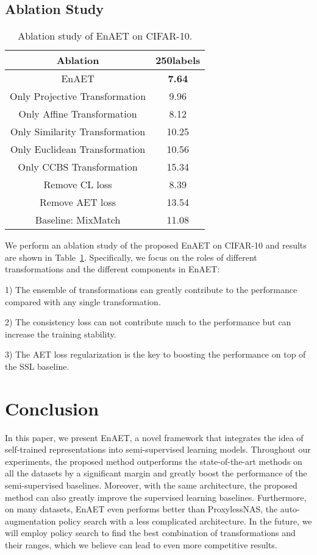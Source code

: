 \documentclass[journal]{IEEEtran}
\begin{document}
\subsection{Ablation Study}
\label{sec:abs}
\begin{table}[!htb]
\centering
\caption{Ablation study of EnAET on CIFAR-10.}
\label{tab:ablation}
\begin{tabular}{cc}
\toprule
Ablation & 250labels \\ \midrule
EnAET & \textbf{7.64}\\
Only Projective Transformation & 9.96 \\
Only Affine Transformation & 8.12 \\
Only Similarity Transformation & 10.25 \\
Only Euclidean Transformation & 10.56 \\
Only CCBS Transformation & 15.34\\
Remove CL loss & 8.39 \\
Remove AET loss & 13.54 \\
Baseline: MixMatch & 11.08\\\bottomrule
\end{tabular}
\end{table}
We perform an ablation study of the proposed EnAET on CIFAR-10 and results are shown in Table~\ref{tab:ablation}. Specifically, we focus on the roles of different transformations  and the different components in EnAET:
\par 1) The ensemble of transformations can greatly contribute to the performance compared with any single transformation.
\par 2) The consistency loss can not contribute much to the performance but can increase the training stability.
\par 3) The AET loss regularization is the key to boosting the performance on top of the SSL baseline.


\section{Conclusion}
\label{sec:conclusion}
In this paper, we present EnAET, a novel  framework that integrates the idea of self-trained representations into semi-supervised learning models. Throughout our experiments, the proposed method outperforms the state-of-the-art methods on all the datasets by a significant margin  and greatly boost the performance of the semi-supervised baselines. Moreover, with the same architecture, the proposed method can also greatly improve the supervised learning baselines. Furthermore, on many datasets, EnAET even performs better than ProxylessNAS, the auto-augmentation policy search with a less complicated architecture. In the future, we will employ policy search to find the best combination of transformations and their ranges, which we believe can lead to even more competitive results.
\end{document}
